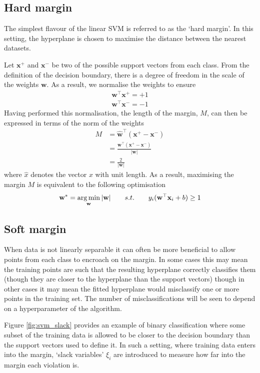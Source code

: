 \subsection{Hard margin}
The simplest flavour of the linear SVM is referred to as the `hard margin'. In this setting, the hyperplane is chosen to maximise the distance between the nearest datasets.

Let $\mathbf{x}^+$ and $\mathbf{x}^-$ be two of the possible support vectors from each class. From the definition of the decision boundary, there is a degree of freedom in the scale of the weights $\mathbf{w}$. As a result, we normalise the weights to ensure
\begin{align}
\mathbf{w}^\top\mathbf{x}^+=+1\\
\mathbf{w}^\top\mathbf{x}^-=-1
\end{align}
Having performed this normalisation, the length of the margin, $M$, can then be expressed in terms of the norm of the weights
\begin{align}
M &=\hat{\mathbf{w}}^\top(\mathbf{x}^+-\mathbf{x}^-)\\
&=\frac{\mathbf{w}^\top(\mathbf{x}^+-\mathbf{x}^-)}{|\mathbf{w}|}\\
&=\frac{2}{|\mathbf{w}|}
\end{align}
where $\hat{x}$ denotes the vector $x$ with unit length. As a result, maximising the margin $M$ is equivalent to the following optimisation
\begin{align}
\mathbf{w}^*=\operatorname*{arg\,min}_\mathbf{w} |\mathbf{w}|\qquad s.t. \qquad y_i(\mathbf{w}^\top\mathbf{x}_i+b)\ge1
\end{align}


\subsection{Soft margin}
When data is not linearly separable it can often be more beneficial to allow points from each class to encroach on the margin. In some cases this may mean the training points are such that the resulting hyperplane correctly classifies them (though they are closer to the hyperplane than the support vectors) though in other cases it may mean the fitted hyperplane would misclassify one or more points in the training set. The number of misclassifications will be seen to depend on a hyperparameter of the algorithm.

Figure \ref{fig:svm_slack} provides an example of binary classification where some subset of the training data is allowed to be closer to the decision boundary than the support vectors used to define it. In such a setting, where training data enters into the margin, `slack variables' $\xi_i$ are introduced to measure how far into the margin each violation is.


